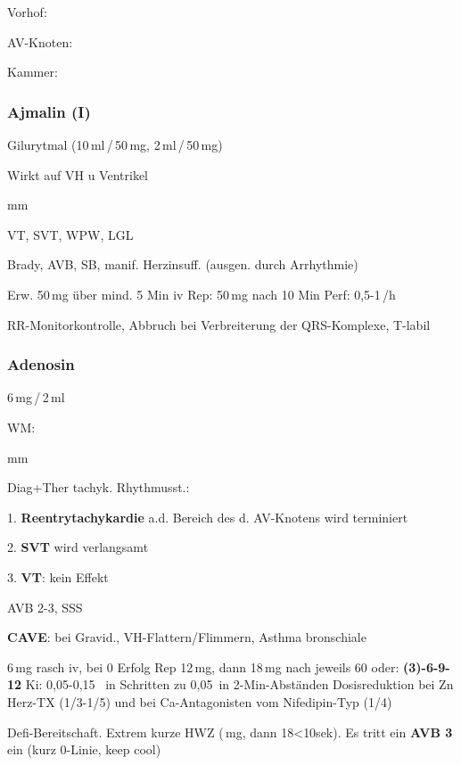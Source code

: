 Vorhof: 

AV-Knoten:

Kammer: 


%

\subsubsection{Ajmalin (I)} 

Gilurytmal (10\,ml\,/\,50\,mg, 2\,ml\,/\,50\,mg)

Wirkt auf VH u Ventrikel

\begin{labeling}[:]{mm}\item[In] \item[KI] VT, SVT, WPW, LGL

\item[KI]  Brady, AVB, SB, manif. Herzinsuff. (ausgen. durch Arrhythmie)


\item[Rx] Erw. 50\,mg über mind. 5 Min iv\newline
Rep: 50\,mg nach 10 Min\newline
Perf: 0,5-1\,/h

RR-Monitorkontrolle, Abbruch bei Verbreiterung der QRS-Komplexe,
T{\textdegree}-labil
\end{labeling}

\subsubsection{Adenosin}

6\,mg\,/\,2\,ml


WM: 
\begin{labeling}[:]{mm}
  \item[In] Diag+Ther tachyk. Rhythmusst.:
  
  1. \textbf{Reentrytachykardie} a.d. Bereich des d. AV-Knotens wird
  terminiert
  
  2. \textbf{SVT} wird verlangsamt
  
  3. \textbf{VT}: kein Effekt
  \item[KI] AVB 2-3{\textdegree}, SSS
  
  \textbf{CAVE}: bei Gravid., VH-Flattern/Flimmern, Asthma bronschiale
  \item[Rx] 6\,mg rasch iv, bei 0 Erfolg Rep 12\,mg, dann 18\,mg
  nach jeweils 60{\textquotesingle}{\textquotesingle}\newline
  oder: \textbf{(3)-6-9-12} \newline
  Ki: 0,05-0,15 \, in Schritten zu 0,05\, in
  2-Min-Abständen\newline
  Dosisreduktion bei Zn Herz-TX (1/3-1/5) und bei Ca-Antagonisten vom
  Nifedipin-Typ (1/4)
  
  Defi-Bereitschaft. Extrem kurze HWZ ({\,mg, dann 18\textless}10sek). Es tritt
  ein \textbf{AVB 3{\textdegree}} ein (kurz 0-Linie, keep cool)
\end{labeling}

